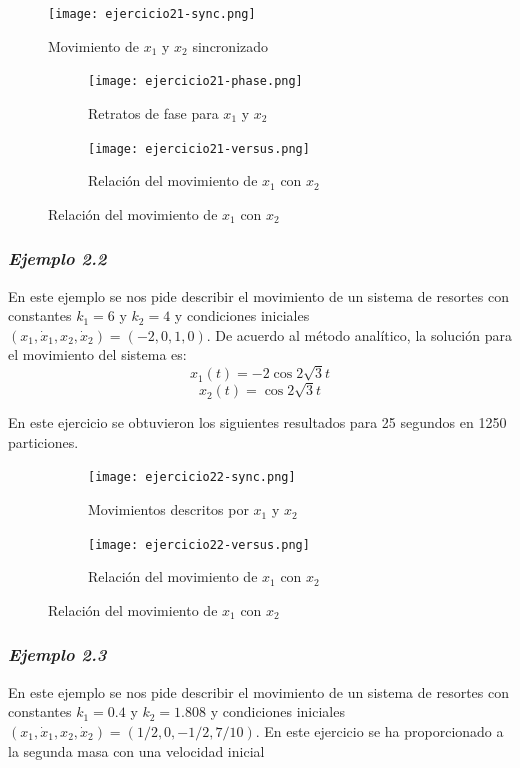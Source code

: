 \documentclass{article}
\begin{document}
\begin{figure}[ht!]
\centering
\texttt{[image: ejercicio21-sync.png]}
\caption{Movimiento de $x_1$ y $x_2$ sincronizado}
\end{figure}

\begin{figure}[ht!]
	\begin{subfigure}[b]{0.5\linewidth}
    \raggedleft
	\texttt{[image: ejercicio21-phase.png]}
    \caption{Retratos de fase para $x_1$ y $x_2$}
	\end{subfigure}
	\begin{subfigure}[b]{0.5\linewidth}
    \raggedright
	\texttt{[image: ejercicio21-versus.png]}
	\caption{Relación del movimiento de $x_1$ con $x_2$}
    \end{subfigure}
\end{figure}

\newpage

\subsubsection*{\textit{Ejemplo 2.2}}

En este ejemplo se nos pide describir el movimiento de un sistema de resortes con constantes $k_1=6$ y $k_2=4$ y condiciones iniciales $(x_1,\dot{x}_1,x_2,\dot{x}_2)=(-2,0,1,0)$. De acuerdo al método analítico, la solución para el movimiento del sistema es:
\[ x_1(t)=-2\cos2\sqrt{3}t \]
\[ x_2(t)=\cos2\sqrt{3}t \]

En este ejercicio se obtuvieron los siguientes resultados para 25 segundos en 1250 particiones.

\begin{figure}[ht!]
	\begin{subfigure}[b]{0.5\linewidth}
    \raggedleft
	\texttt{[image: ejercicio22-sync.png]}
    \caption{Movimientos descritos por $x_1$ y $x_2$}
	\end{subfigure}
	\begin{subfigure}[b]{0.5\linewidth}
    \raggedright
	\texttt{[image: ejercicio22-versus.png]}
	\caption{Relación del movimiento de $x_1$ con $x_2$}
    \end{subfigure}
\end{figure}

\subsubsection*{\textit{Ejemplo 2.3}}

En este ejemplo se nos pide describir el movimiento de un sistema de resortes con constantes $k_1=0.4$ y $k_2=1.808$ y condiciones iniciales $(x_1,\dot{x}_1,x_2,\dot{x}_2)=(1/2,0,-1/2,7/10)$. En este ejercicio se ha proporcionado a la segunda masa con una velocidad inicial
\end{document}
